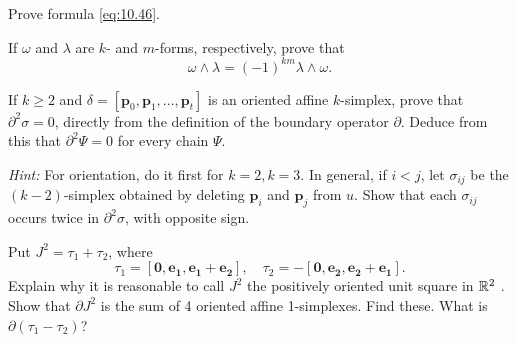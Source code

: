 \begin{myexercise}
    \label{ex:10.14}
    Prove formula \eqref{eq:10.46}.
\end{myexercise}


\begin{myexercise}
    \label{ex:10.15}
    If $\omega$ and $\lambda$ are $k$- and $m$-forms, respectively, prove that
    \begin{equation*}
        \omega \wedge \lambda =
        (-1)^{km} \lambda \wedge \omega .
    \end{equation*}
\end{myexercise}


\begin{myexercise}
    \label{ex:10.16}
    If $k \geq 2$ and $\delta = [\mathbf{p}_0, \mathbf{p}_1, ... , \mathbf{p}_t]$ is an oriented affine $k$-simplex,
    prove that $\partial^2 \sigma = 0$,
    directly from the definition of the boundary operator $\partial$.
    Deduce from this that $\partial^2 \Psi = 0$ for every chain $\Psi$.

    \emph{Hint:} For orientation, do it first for $k= 2, k = 3$.
    In general, if $i <j$, let $\sigma_{ij}$ be the $(k - 2)$-simplex obtained by deleting $\mathbf{p}_i$ and $\mathbf{p}_j$ from $u$.
    Show that each $\sigma_{ij}$ occurs twice in $\partial^2 \sigma$, with opposite sign.
\end{myexercise}


\begin{myexercise}
    \label{ex:10.17}
    Put $J^2 = \tau_1 + \tau_2$, where
    \begin{equation*}
        \tau_1 =  \left[ \mathbf{0,e_1,e_1+e_2} \right],
        \quad
        \tau_2 = -\left[ \mathbf{0,e_2,e_2+e_1} \right].
    \end{equation*}
    Explain why it is reasonable to call $J^2$ the positively oriented unit square in ${\protect\mathbb R}^2$ .
    Show that $\partial J^2$ is the sum of 4 oriented affine 1-simplexes. Find these. What is $\partial (\tau_1 - \tau_2)$?
\end{myexercise}


